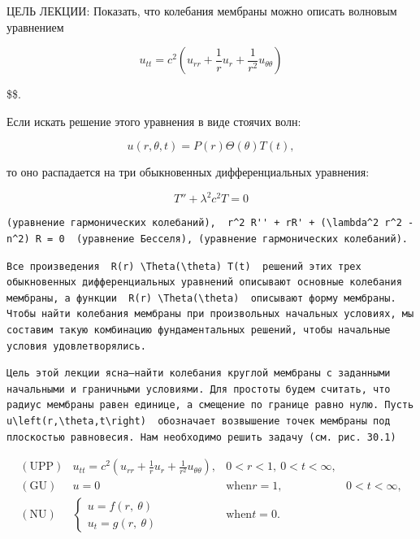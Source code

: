 \documentclass[
  ukrainian,
]{article}
\begin{document}
ЦЕЛЬ ЛЕКЦИИ: Показать, что колебания мембраны можно описать волновым
уравнением

\[
u_{tt} = c^2 \left( u_{rr} + \frac{1}{r} u_r + \frac{1}{r^2} u_{\theta\theta} \right)
\]

\$\$.

Если искать решение этого уравнения в виде стоячих волн:

\[
u(r, \theta, t) = P(r) \Theta(\theta) T(t),
\]

то оно распадается на три обыкновенных дифференциальных уравнения:

\[
T'' + \lambda^2 c^2 T = 0
\]

\begin{verbatim}
(уравнение гармонических колебаний),  r^2 R'' + rR' + (\lambda^2 r^2 - n^2) R = 0  (уравнение Бесселя), (уравнение гармонических колебаний).
\end{verbatim}

\begin{verbatim}
Все произведения  R(r) \Theta(\theta) T(t)  решений этих трех обыкновенных дифференциальных уравнений описывают основные колебания мембраны, а функции  R(r) \Theta(\theta)  описывают форму мембраны. Чтобы найти колебания мембраны при произвольных начальных условиях, мы составим такую комбинацию фундаментальных решений, чтобы начальные условия удовлетворялись.
\end{verbatim}

\begin{verbatim}
Цель этой лекции ясна—найти колебания круглой мембраны с заданными начальными и граничными условиями. Для простоты будем считать, что радиус мембраны равен единице, а смещение по границе равно нулю. Пусть  u\left(r,\theta,t\right)  обозначает возвышение точек мембраны под плоскостью равновесия. Нам необходимо решить задачу (см. рис. 30.1)
\end{verbatim}

\[
\begin{array}{lll} (\text{UPP}) & u_{tt} = c^2 \left( u_{rr} + \frac{1}{r} u_r + \frac{1}{r^2} u_{\theta\theta} \right), & 0 < r < 1, \ 0 <t < \infty, \\ (\text{GU}) & u = 0 & \text{when} r = 1, & 0 < t < \infty, \\ (\text{NU}) & \begin{cases} u = f(r, \ \theta) \\ u_t = g(r, \ \theta) \end{cases} & \text{when} t = 0. \end{array}
\]
\end{document}
